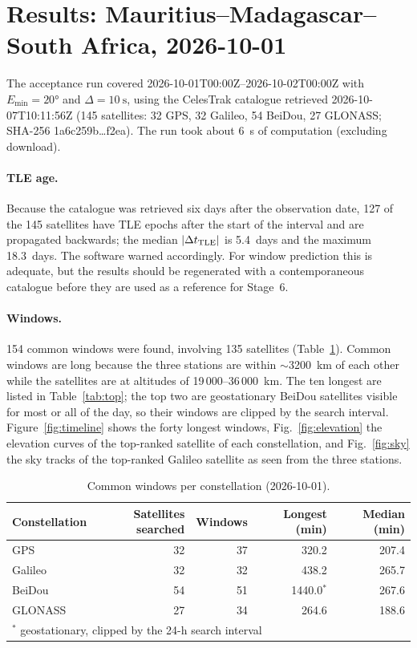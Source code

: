 \documentclass[11pt,a4paper]{article}
\newcommand{\code}[1]{{\ttfamily\def\_{\textunderscore\allowbreak}#1}}
\begin{document}
\section{Results: Mauritius--Madagascar--South Africa, 2026-10-01}

The acceptance run covered 2026-10-01T00:00Z--2026-10-02T00:00Z with
$E_{\min}=\ang{20}$ and $\Delta=\SI{10}{\second}$, using the CelesTrak
catalogue retrieved 2026-10-07T10:11:56Z (145 satellites: 32 GPS, 32
Galileo, 54 BeiDou, 27 GLONASS; SHA-256 \code{1a6c259b\dots f2ea}). The run
took about \SI{6}{\second} of computation (excluding download).

\paragraph{TLE age.} Because the catalogue was retrieved six days after the
observation date, 127 of the 145 satellites have TLE epochs after the start
of the interval and are propagated backwards; the median $|\Delta t_{\rm TLE}|$
is 5.4~days and the maximum 18.3~days. The software warned accordingly. For
window prediction this is adequate, but the results should be regenerated
with a contemporaneous catalogue before they are used as a reference for
Stage~6.

\paragraph{Windows.} 154 common windows were found, involving 135
satellites (Table~\ref{tab:constellations}). Common windows are long because
the three stations are within $\sim$\SI{3200}{\kilo\metre} of each other while
the satellites are at altitudes of 19\,000--36\,000~km. The ten longest are
listed in Table~\ref{tab:top}; the top two are geostationary BeiDou
satellites visible for most or all of the day, so their windows are clipped
by the search interval. Figure~\ref{fig:timeline} shows the forty longest
windows, Fig.~\ref{fig:elevation} the elevation curves of the top-ranked
satellite of each constellation, and Fig.~\ref{fig:sky} the sky tracks of
the top-ranked Galileo satellite as seen from the three stations.

\begin{table}[h]
\centering
\caption{Common windows per constellation (2026-10-01).}
\label{tab:constellations}
\small
\begin{tabular}{lrrrr}
\toprule
Constellation & Satellites searched & Windows & Longest (min) & Median (min)\\
\midrule
GPS     & 32 & 37 & 320.2  & 207.4\\
Galileo & 32 & 32 & 438.2  & 265.7\\
BeiDou  & 54 & 51 & 1440.0$^\ast$ & 267.6\\
GLONASS & 27 & 34 & 264.6  & 188.6\\
\bottomrule
\multicolumn{5}{l}{\footnotesize $^\ast$ geostationary, clipped by the 24-h search interval}
\end{tabular}
\end{table}
\end{document}

